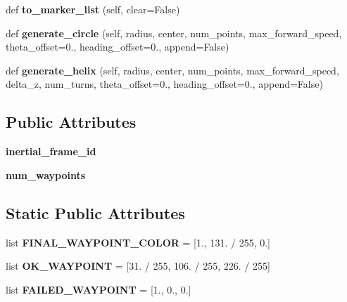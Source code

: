 \begin{DoxyCompactItemize}
def {\bfseries to\+\_\+marker\+\_\+list} (self, clear=False)
\item 
\mbox{\label{classuuv__waypoints_1_1waypoint__set_1_1WaypointSet_a92314cfdf9b557444c9f48840a52a591}} 
def {\bfseries generate\+\_\+circle} (self, radius, center, num\+\_\+points, max\+\_\+forward\+\_\+speed, theta\+\_\+offset=0., heading\+\_\+offset=0., append=False)
\item 
\mbox{\label{classuuv__waypoints_1_1waypoint__set_1_1WaypointSet_a9d90662b32e599605a6dc4e6c6b03162}} 
def {\bfseries generate\+\_\+helix} (self, radius, center, num\+\_\+points, max\+\_\+forward\+\_\+speed, delta\+\_\+z, num\+\_\+turns, theta\+\_\+offset=0., heading\+\_\+offset=0., append=False)
\end{DoxyCompactItemize}
\subsection*{Public Attributes}
\begin{DoxyCompactItemize}
\item 
\mbox{\label{classuuv__waypoints_1_1waypoint__set_1_1WaypointSet_a6ba85c9c07646cca0864efaae90c8132}} 
{\bfseries inertial\+\_\+frame\+\_\+id}
\item 
\mbox{\label{classuuv__waypoints_1_1waypoint__set_1_1WaypointSet_a68d2898978db05ef85983dd92a0c56a9}} 
{\bfseries num\+\_\+waypoints}
\end{DoxyCompactItemize}
\subsection*{Static Public Attributes}
\begin{DoxyCompactItemize}
\item 
\mbox{\label{classuuv__waypoints_1_1waypoint__set_1_1WaypointSet_ae7647d7830bad645dd98987eaa8ad8cf}} 
list {\bfseries F\+I\+N\+A\+L\+\_\+\+W\+A\+Y\+P\+O\+I\+N\+T\+\_\+\+C\+O\+L\+OR} = \mbox{[}1., 131. / 255, 0.\mbox{]}
\item 
\mbox{\label{classuuv__waypoints_1_1waypoint__set_1_1WaypointSet_a3107c719800eb8f8dbe4d53395d0a169}} 
list {\bfseries O\+K\+\_\+\+W\+A\+Y\+P\+O\+I\+NT} = \mbox{[}31. / 255, 106. / 255, 226. / 255\mbox{]}
\item 
\mbox{\label{classuuv__waypoints_1_1waypoint__set_1_1WaypointSet_a72c0939635300a1fc6196b36a7ff75f8}} 
list {\bfseries F\+A\+I\+L\+E\+D\+\_\+\+W\+A\+Y\+P\+O\+I\+NT} = \mbox{[}1., 0., 0.\mbox{]}
\end{DoxyCompactItemize}


